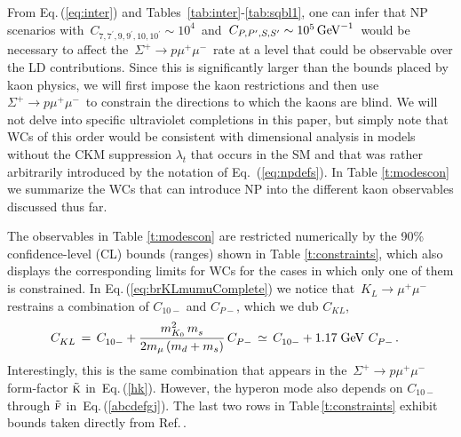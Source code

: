 \documentclass[amsmath,amssymb,aps,nofootinbib,prd,preprint,superscriptaddress,tightenlines,a4paper,bm]{revtex4-2}
\begin{document}
From Eq.\,(\ref{eq:inter}) and Tables~\ref{tab:inter}-\ref{tab:sqbl1}, one can infer that NP scenarios with \,$C_{7,7^\prime,9,9^\prime,10,10^\prime}\sim 10^4$\, and \,$C_{P,P^\prime,S,S^\prime}\sim 10^5{\rm\,GeV}^{-1}$\, would be necessary to affect the \,$\Sigma^+\to p \mu^+\mu^-$\, rate at a level that could be observable over the LD contributions.
Since this is significantly larger than the bounds placed by kaon physics, we will first impose the kaon restrictions and then use \,$\Sigma^+\to p \mu^+\mu^-$\, to constrain the directions to which the kaons are blind.
We will not delve into specific ultraviolet completions in this paper, but simply note that WCs of this order would be consistent with dimensional analysis in models without the CKM suppression $\lambda_t$ that occurs in the SM and that was rather arbitrarily introduced by the notation of Eq.~(\ref{eq:npdefs}).
In Table \ref{t:modescon} we summarize the WCs that can introduce NP into the different kaon observables discussed thus far.

The observables in Table \ref{t:modescon} are restricted numerically by the 90\% confidence-level (CL) bounds (ranges) \cite{Workman:2022ynf} shown in Table \ref{t:constraints}, which also displays the corresponding limits for WCs for the cases in which only one of them is constrained.
In Eq.\,(\ref{eq:brKLmumuComplete}) we notice that \,$K_L\to\mu^+\mu^-$\, restrains a combination of $C_{10-}$ and $C_{P-}$, which we dub $C_{KL}$,
\begin{align}
C_{KL}^{} & \,=\, C_{10-}^{} + \frac{ m_{K_0}^2\, m_s^{}}{2m_\mu\, (m_d+m_s)}\, C_{P-}^{} \,\simeq\, C_{10-}^{} + 1.17\;{\rm GeV}~C_{P-}^{} \,. &
\end{align}
Interestingly, this is the same combination that appears in the \,$\Sigma^+\to p \mu^+\mu^-$\, form-factor $\tilde{\textsc k}$ in~Eq.\,(\ref{hk}).
However, the hyperon mode also depends on  $C_{10-}$  through  $\tilde{\textsc f}$ in~Eq.\,(\ref{abcdefgj}).
The last two rows in  Table\,\ref{t:constraints} exhibit bounds taken directly from Ref.\,\cite{Mertens:2011ts}.
\end{document}
